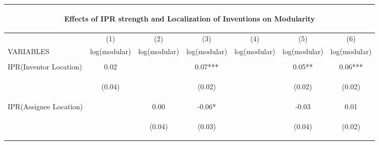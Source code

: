 \begin{center}
\begin{tabular}{lcccccc}
\multicolumn{7}{c}{\begin{large}Effects of IPR strength and Localization of Inventions on Modularity\label{a4}\end{large}} \\ \hline
 & (1) & (2) & (3) & (4) & (5) & (6) \\
VARIABLES & log(modular) & log(modular) & log(modular) & log(modular) & log(modular) & log(modular) \\ \hline
\vspace{4pt} & \begin{footnotesize}\end{footnotesize} & \begin{footnotesize}\end{footnotesize} & \begin{footnotesize}\end{footnotesize} & \begin{footnotesize}\end{footnotesize} & \begin{footnotesize}\end{footnotesize} & \begin{footnotesize}\end{footnotesize} \\
IPR(Inventor Location) & 0.02 &  & 0.07*** &  & 0.05** & 0.06*** \\
\vspace{4pt} & \begin{footnotesize}(0.04)\end{footnotesize} & \begin{footnotesize}\end{footnotesize} & \begin{footnotesize}(0.02)\end{footnotesize} & \begin{footnotesize}\end{footnotesize} & \begin{footnotesize}(0.02)\end{footnotesize} & \begin{footnotesize}(0.02)\end{footnotesize} \\
IPR(Assignee Location) &  & 0.00 & -0.06* &  & -0.03 & 0.01 \\
\vspace{4pt} & \begin{footnotesize}\end{footnotesize} & \begin{footnotesize}(0.04)\end{footnotesize} & \begin{footnotesize}(0.03)\end{footnotesize} & \begin{footnotesize}\end{footnotesize} & \begin{footnotesize}(0.04)\end{footnotesize} & \begin{footnotesize}(0.02)\end{footnotesize} \\

\end{tabular}
\end{center}
